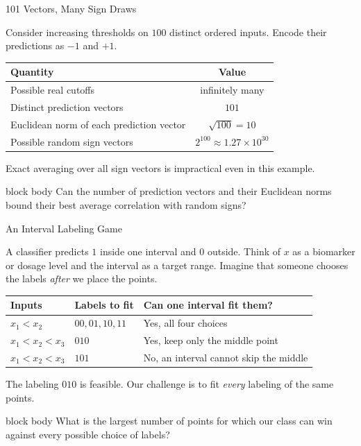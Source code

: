 \documentclass[aspectratio=169,10pt]{beamer}
\newcommand{\KeyBox}[1]{%
  \begin{beamercolorbox}[rounded=true,sep=0.22cm,wd=\linewidth]{block body}
    #1
  \end{beamercolorbox}%
}
\begin{document}
\begin{frame}[t]{101 Vectors, Many Sign Draws}
  \vspace{0.04cm}
  \small

  Consider increasing thresholds on $100$ distinct ordered inputs.
  Encode their predictions as $-1$ and $+1$.
  \begin{center}
  \renewcommand{\arraystretch}{1.15}
  \begin{tabular}{lc}
    \toprule
    Quantity & Value\\
    \midrule
    Possible real cutoffs & infinitely many\\
    Distinct prediction vectors & $101$\\
    Euclidean norm of each prediction vector & $\sqrt{100}=10$\\
    Possible random sign vectors & $2^{100}\approx1.27\times10^{30}$\\
    \bottomrule
  \end{tabular}
  \end{center}
  Exact averaging over all sign vectors is impractical even in this example.
  \vspace{0.15cm}
  \KeyBox{Can the number of prediction vectors and their Euclidean norms
  bound their best average correlation with random signs?}

\end{frame}

\begin{frame}[t]{An Interval Labeling Game}
  \vspace{0.04cm}
  \small

  A classifier predicts $1$ inside one interval and $0$ outside. Think of
  $x$ as a biomarker or dosage level and the interval as a target range.
  Imagine that someone chooses the labels \emph{after} we place the points.
  \begin{center}
  \renewcommand{\arraystretch}{1.15}
  \begin{tabular}{lll}
    \toprule
    Inputs & Labels to fit & Can one interval fit them?\\
    \midrule
    $x_1<x_2$ & $00,01,10,11$ & Yes, all four choices\\
    $x_1<x_2<x_3$ & $010$ & Yes, keep only the middle point\\
    $x_1<x_2<x_3$ & $101$ & No, an interval cannot skip the middle\\
    \bottomrule
  \end{tabular}
  \end{center}
  The labeling $010$ is feasible. Our challenge is to fit
  \emph{every} labeling of the same points.
  \vspace{0.20cm}
  \KeyBox{What is the largest number of points for which our class can win
  against every possible choice of labels?}

\end{frame}
\end{document}
